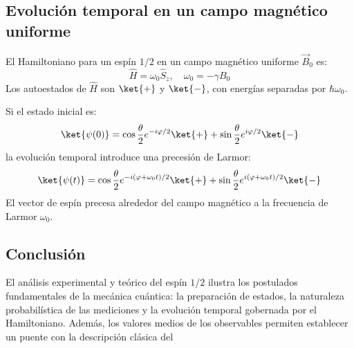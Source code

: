 \subsection*{Evolución temporal en un campo magnético uniforme}

El Hamiltoniano para un espín $1/2$ en un campo magnético uniforme $\vec{B}_0$ es:
\[
\hat{H} = \omega_0 \hat{S}_z, \quad \omega_0 = -\gamma B_0
\]
Los autoestados de $\hat{H}$ son $\ket{+}$ y $\ket{-}$, con energías separadas por $\hbar\omega_0$.

Si el estado inicial es:
\[
\ket{\psi(0)} = \cos\frac{\theta}{2} e^{-i\varphi/2} \ket{+} + \sin\frac{\theta}{2} e^{i\varphi/2} \ket{-}
\]
la evolución temporal introduce una precesión de Larmor:
\[
\ket{\psi(t)} = \cos\frac{\theta}{2} e^{-i(\varphi+\omega_0 t)/2} \ket{+} + \sin\frac{\theta}{2} e^{i(\varphi+\omega_0 t)/2} \ket{-}
\]
El vector de espín precesa alrededor del campo magnético a la frecuencia de Larmor $\omega_0$.

\subsection*{Conclusión}

El análisis experimental y teórico del espín $1/2$ ilustra los postulados fundamentales de la mecánica cuántica: la preparación de estados, la naturaleza probabilística de las mediciones y la evolución temporal gobernada por el Hamiltoniano. Además, los valores medios de los observables permiten establecer un puente con la descripción clásica del